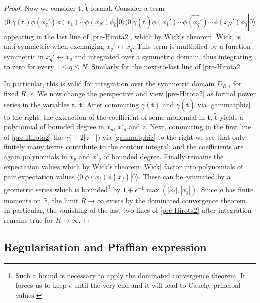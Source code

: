 \documentclass[10pt,a4paper]{amsart}
\numberwithin{equation}{section}
\begin{document}
\begin{proof}
Now we consider $\mathbf{t}$, $\tilde{\mathbf{t}}$ formal. Consider a term
\[
\langle 0|\gamma(\mathbf{t}) \phi(x_q')\phi(x_1)\cdots
\phi(x_N) \phi_0|0\rangle
\langle 0|\gamma(\tilde{\mathbf{t}}) \phi(x_1')\cdots \widehat{\phi(x_q')} \cdots
\phi(x_N')
\phi_0|0\rangle
\]
appearing in the last line of
\eqref{pre-Hirota2}, which by Wick's theorem \eqref{Wick}
is anti-symmetric when exchanging
$x_q'\leftrightarrow x_q$. This term is
multiplied by a function symmetric in
$x_q'\leftrightarrow x_q$ and integrated over a
symmetric domain, thus integrating to zero for every $1\leq q\leq N$.
Similarly for the next-to-last line of \eqref{pre-Hirota2}.

In particular, this is valid for integration over the symmetric domain
$D_{R,\epsilon}$ for fixed $R$, $\epsilon$. We now change the perspective
and view \eqref{pre-Hirota2} as formal power series in the variables
$\mathbf{t}$, $\tilde{\mathbf{t}}$. After commuting $\gamma(\mathbf{t})$
and $\gamma(\tilde{\mathbf{t}})$ via \eqref{gammatphiz} to the right,
the extraction of the coefficient of some monomial in
$\mathbf{t}$, $\tilde{\mathbf{t}}$ yields a polynomial of bounded degree
in $x_p$, $x'_q$ and $z$. Next, commuting in the first line of
\eqref{pre-Hirota2} the $\gamma\bigl(\pm 2\bigl[z^{-1}\bigr]\bigr)$ via \eqref{gammatphiz}
to the right we see that only finitely many terms contribute to the
contour integral, and the coefficients are again polynomials in $x_p$
and $x'_q$ of bounded degree. Finally remains the expectation values
which by Wick's theorem \eqref{Wick} factor into polynomials of pair
expectation values $\langle 0|\phi(x_i)\phi(x_j)|0\rangle$. These can
be estimated by a geometric series which is bounded\footnote{Such a
 bound is necessary to apply the dominated convergence theorem. It
 forces us to keep $\epsilon$ until the very end and it will lead to
 Cauchy principal values.} by $1+\epsilon^{-1}\max(|x_i|,|x_j|)$.
Since $\rho$ has finite moments on $\mathbb{R}$, the limit
$R\to \infty$ exists by the dominated convergence theorem. In
particular, the vanishing of the last two lines of \eqref{pre-Hirota2}
after integration remains true for $R\to \infty$.
\end{proof}

\subsection{Regularisation and Pfaffian expression}
\end{document}
